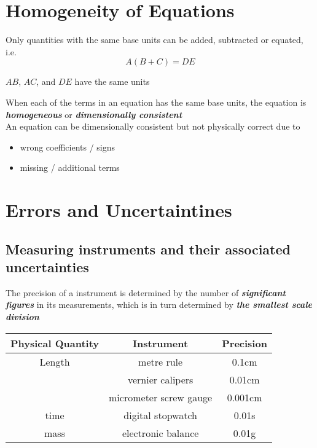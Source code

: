 \documentclass[a4paper, 10pt]{article}
\begin{document}
\section{Homogeneity of Equations}
Only quantities with the same base units can be added, subtracted or equated, i.e.
\[
   A (B+C) =  DE 
\]
\begin{center}
      $AB$, $AC$, and $DE$ have the same units
\end{center}	

When each of the terms in an equation has the same base units, the equation is \textbf{\textit{homogeneous}} or \textbf{\textit{dimensionally consistent}} \\

An equation can be dimensionally consistent but not physically correct due to
\begin{itemize}
   \item wrong coefficients / signs 
   \item missing / additional terms
\end{itemize}	

\section{Errors and Uncertaintines}
\subsection{Measuring instruments and their associated uncertainties}
   The precision of a instrument is determined by the number of \textbf{\textit{significant figures}} in its measurements, which is in turn determined by \textbf{\textit{the smallest scale division}}
   \begin{center}
      \begin{tabular}{c|c|c}
         \hline
         Physical Quantity & Instrument & Precision \\
         \hline 
         Length & metre rule & 0.1cm \\
                & vernier calipers & 0.01cm  \\
                & micrometer screw gauge & 0.001cm \\
         time & digital stopwatch & 0.01s \\
         mass & electronic balance & 0.01g \\
         \hline
      \end{tabular}
   \end{center}
\end{document}
